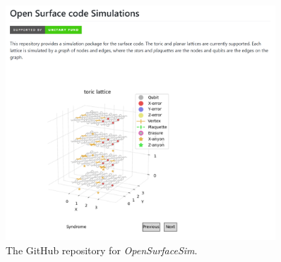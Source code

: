 \begin{figure}[htbp]
    \centering
    \includegraphics[width=0.9\textwidth]{fig/opensurfacesim.png}
    \caption{The GitHub repository for \emph{OpenSurfaceSim}.}
    \label{fig:opensurfacesim}
\end{figure}






